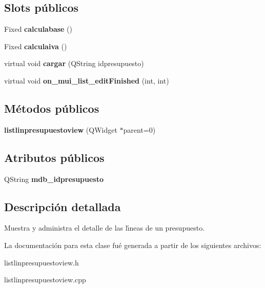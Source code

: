 \subsection*{Slots p\'{u}blicos}
\begin{CompactItemize}
\item 
Fixed {\bf calculabase} ()\label{classlistlinpresupuestoview_i0}

\item 
Fixed {\bf calculaiva} ()\label{classlistlinpresupuestoview_i1}

\item 
virtual void {\bf cargar} (QString idpresupuesto)\label{classlistlinpresupuestoview_i2}

\item 
virtual void {\bf on\_\-mui\_\-list\_\-edit\-Finished} (int, int)\label{classlistlinpresupuestoview_i3}

\end{CompactItemize}
\subsection*{M\'{e}todos p\'{u}blicos}
\begin{CompactItemize}
\item 
{\bf listlinpresupuestoview} (QWidget $\ast$parent=0)\label{classlistlinpresupuestoview_a0}

\end{CompactItemize}
\subsection*{Atributos p\'{u}blicos}
\begin{CompactItemize}
\item 
QString {\bf mdb\_\-idpresupuesto}\label{classlistlinpresupuestoview_o0}

\end{CompactItemize}


\subsection{Descripci\'{o}n detallada}
Muestra y administra el detalle de las l\'{\i}neas de un presupuesto. 



La documentaci\'{o}n para esta clase fu\'{e} generada a partir de los siguientes archivos:\begin{CompactItemize}
\item 
listlinpresupuestoview.h\item 
listlinpresupuestoview.cpp\end{CompactItemize}
